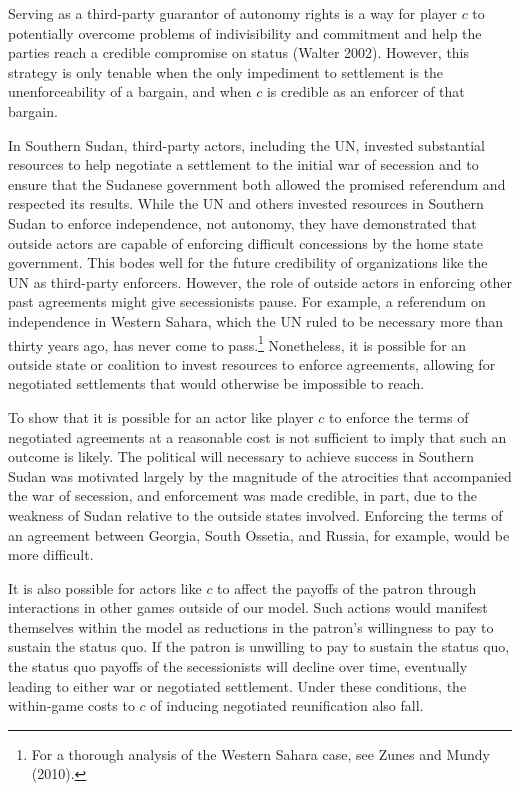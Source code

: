 \documentclass[11pt,letterpaper, notitlepage]{article}
\begin{document}
Serving as a third-party guarantor of autonomy rights is a way for player $c$ to potentially overcome problems of indivisibility and commitment and help the parties reach a credible compromise on status (Walter 2002). However, this strategy is only tenable when the only impediment to settlement is the unenforceability of a bargain, and when $c$ is credible as an enforcer of that bargain.


In Southern Sudan, third-party actors, including the UN, invested substantial resources to help negotiate a settlement to the initial war of secession and to ensure that the Sudanese government both allowed the promised referendum and respected its results. While the UN and others invested resources in Southern Sudan to enforce independence, not autonomy, they have demonstrated that outside actors are capable of enforcing difficult concessions by the home state government. This bodes well for the future credibility of organizations like the UN as third-party enforcers. However, the role of outside actors in enforcing other past agreements might give secessionists pause. For example, a referendum on independence in Western Sahara, which the UN ruled to be necessary more than thirty years ago, has never come to pass.\footnote{For a thorough analysis of the Western Sahara case, see Zunes and Mundy (2010).} Nonetheless, it is possible for an outside state or coalition to invest resources to enforce agreements, allowing for negotiated settlements that would otherwise be impossible to reach.

To show that it is possible for an actor like player $c$ to enforce the terms of negotiated agreements at a reasonable cost is not sufficient to imply that such an outcome is likely. The political will necessary to achieve success in Southern Sudan was motivated largely by the magnitude of the atrocities that accompanied the war of secession, and enforcement was made credible, in part, due to the weakness of Sudan relative to the outside states involved. Enforcing the terms of an agreement between Georgia, South Ossetia, and Russia, for example, would be more difficult.

It is also possible for actors like $c$ to affect the payoffs of the patron through interactions in other games outside of our model. Such actions would manifest themselves within the model as reductions in the patron's willingness to pay to sustain the status quo. If the patron is unwilling to pay to sustain the status quo, the status quo payoffs of the secessionists will decline over time, eventually leading to either war or negotiated settlement. Under these conditions, the within-game costs to $c$ of inducing negotiated reunification also fall.
\end{document}
